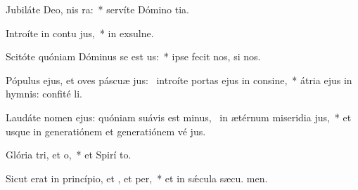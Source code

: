 \item Jubiláte Deo, nis ra:~* servíte Dómino  tia.
\item Introíte in contu jus,~* in exsulne.
\item Scitóte quóniam Dóminus se est us:~* ipse fecit nos,   si nos.
\item Pópulus ejus, et oves páscuæ jus:~\pscross{} introíte portas ejus in consine,~* átria ejus in hymnis: confité li.
\item Laudáte nomen ejus: quóniam suávis est minus,~\pscross{} in ætérnum miseridia jus,~* et usque in generatiónem et generatiónem vé jus.
\item Glória tri, et o,~* et Spirí to.
\item Sicut erat in princípio, et , et per,~* et in sǽcula sæcu. men.
